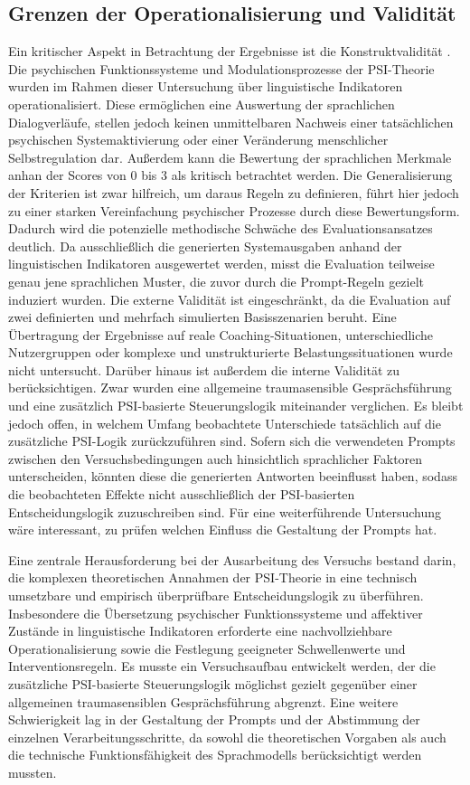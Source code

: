 \subsection{Grenzen der Operationalisierung und Validität}
Ein kritischer Aspekt in Betrachtung der Ergebnisse ist die Konstruktvalidität \citep{morris1981response}. Die psychischen Funktionssysteme und Modulationsprozesse der PSI-Theorie wurden im Rahmen dieser Untersuchung über linguistische Indikatoren operationalisiert. Diese ermöglichen eine Auswertung der sprachlichen Dialogverläufe, stellen jedoch keinen unmittelbaren Nachweis einer tatsächlichen psychischen Systemaktivierung oder einer Veränderung menschlicher Selbstregulation dar. Außerdem kann die Bewertung der sprachlichen Merkmale anhan der Scores von 0 bis 3 als kritisch betrachtet werden. Die Generalisierung der Kriterien ist zwar hilfreich, um daraus Regeln zu definieren, führt hier jedoch zu einer starken Vereinfachung psychischer Prozesse durch diese Bewertungsform. 
Dadurch wird die potenzielle methodische Schwäche des Evaluationsansatzes deutlich. Da ausschließlich die generierten Systemausgaben anhand der linguistischen Indikatoren ausgewertet werden, misst die Evaluation teilweise genau jene sprachlichen Muster, die zuvor durch die Prompt-Regeln gezielt induziert wurden. 
Die externe Validität ist eingeschränkt, da die Evaluation auf zwei definierten und mehrfach simulierten Basisszenarien beruht. Eine Übertragung der Ergebnisse auf reale Coaching-Situationen, unterschiedliche Nutzergruppen oder komplexe und unstrukturierte Belastungssituationen wurde nicht untersucht.
Darüber hinaus ist außerdem die interne Validität zu berücksichtigen. Zwar wurden eine allgemeine traumasensible Gesprächsführung und eine zusätzlich PSI-basierte Steuerungslogik miteinander verglichen. Es bleibt jedoch offen, in welchem Umfang beobachtete Unterschiede tatsächlich auf die zusätzliche PSI-Logik zurückzuführen sind. Sofern sich die verwendeten Prompts zwischen den Versuchsbedingungen auch hinsichtlich sprachlicher Faktoren unterscheiden, könnten diese die generierten Antworten beeinflusst haben, sodass die beobachteten Effekte nicht ausschließlich der PSI-basierten Entscheidungslogik zuzuschreiben sind. Für eine weiterführende Untersuchung wäre interessant, zu prüfen welchen Einfluss die Gestaltung der Prompts hat.

Eine zentrale Herausforderung bei der Ausarbeitung des Versuchs bestand darin, die komplexen theoretischen Annahmen der PSI-Theorie in eine technisch umsetzbare und empirisch überprüfbare Entscheidungslogik zu überführen. Insbesondere die Übersetzung psychischer Funktionssysteme und affektiver Zustände in linguistische Indikatoren erforderte eine nachvollziehbare Operationalisierung sowie die Festlegung geeigneter Schwellenwerte und Interventionsregeln. Es musste ein Versuchsaufbau entwickelt werden, der die zusätzliche PSI-basierte Steuerungslogik möglichst gezielt gegenüber einer allgemeinen traumasensiblen Gesprächsführung abgrenzt. Eine weitere Schwierigkeit lag in der Gestaltung der Prompts und der Abstimmung der einzelnen Verarbeitungsschritte, da sowohl die theoretischen Vorgaben als auch die technische Funktionsfähigkeit des Sprachmodells berücksichtigt werden mussten. 

